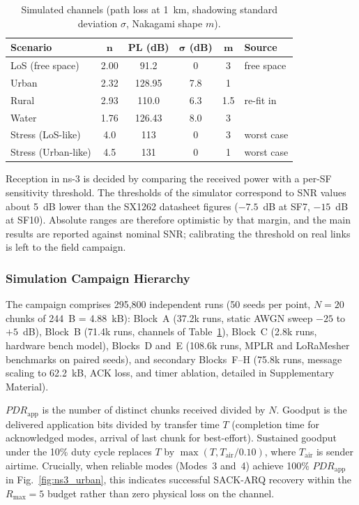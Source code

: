 \documentclass[journal]{IEEEtran}
\begin{document}
\begin{table}[htpb]
\centering
\caption{Simulated channels (path loss at 1~km, shadowing standard deviation $\sigma$, Nakagami shape $m$).}
\label{tab:channel}
\renewcommand{\arraystretch}{1.0}
\footnotesize
\begin{tabular}{|l|c|c|c|c|l|}
\hline
\textbf{Scenario} & $\boldsymbol{n}$ & \textbf{PL (dB)} & $\boldsymbol{\sigma}$ (dB) & $\boldsymbol{m}$ & \textbf{Source} \\ \hline
\acs{LoS} (free space) & 2.00 & 91.2 & 0 & 3 & free space \\ \hline
Urban & 2.32 & 128.95 & 7.8 & 1 & \cite{petajajarvi2015} \\ \hline
Rural & 2.93 & 110.0 & 6.3 & 1.5 & re-fit in \cite{azevedo2024} \\ \hline
Water & 1.76 & 126.43 & 8.0 & 3 & \cite{petajajarvi2015} \\ \hline
Stress (LoS-like) & 4.0 & 113 & 0 & 3 & worst case \\ \hline
Stress (Urban-like) & 4.5 & 131 & 0 & 1 & worst case \\ \hline
\end{tabular}
\end{table}

Reception in ns-3 is decided by comparing the received power with a per-SF sensitivity threshold. The thresholds of the simulator correspond to SNR values about 5~dB lower than the SX1262 datasheet figures ($-7.5$~dB at SF7, $-15$~dB at SF10). Absolute ranges are therefore optimistic by that margin, and the main results are reported against nominal SNR; calibrating the threshold on real links is left to the field campaign.

\subsubsection{Simulation Campaign Hierarchy}
The campaign comprises 295,800 independent runs (50 seeds per point, $N=20$ chunks of 244~B = 4.88~kB): Block~A (37.2k runs, static AWGN sweep $-25$ to $+5$~dB), Block~B (71.4k runs, channels of Table~\ref{tab:channel}), Block~C (2.8k runs, hardware bench model), Blocks~D and~E (108.6k runs, MPLR and LoRaMesher benchmarks on paired seeds), and secondary Blocks~F--H (75.8k runs, message scaling to 62.2~kB, ACK loss, and timer ablation, detailed in Supplementary Material).

$PDR_{\mathrm{app}}$ is the number of distinct chunks received divided by $N$. Goodput is the delivered application bits divided by transfer time $T$ (completion time for acknowledged modes, arrival of last chunk for best-effort). Sustained goodput under the 10\% duty cycle replaces $T$ by $\max(T, T_{\mathrm{air}}/0.10)$, where $T_{\mathrm{air}}$ is sender airtime. Crucially, when reliable modes (Modes~3 and~4) achieve 100\% $PDR_{\mathrm{app}}$ in Fig.~\ref{fig:ns3_urban}, this indicates successful SACK-ARQ recovery within the $R_{\mathrm{max}} = 5$ budget rather than zero physical loss on the channel.
\end{document}
